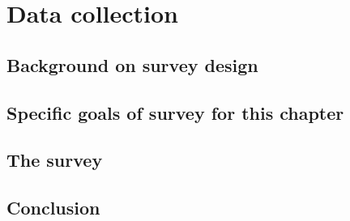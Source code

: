 \chapter{Data collection}

\section{Background on survey design}
\section{Specific goals of survey for this chapter}
\section{The survey}
\section{Conclusion}
